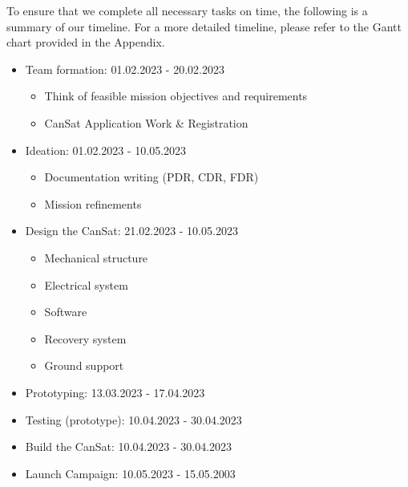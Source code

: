 \documentclass[11pt]{article}
\begin{document}
To ensure that we complete all necessary tasks on time, the following is a summary of our timeline. For a more detailed timeline, please refer to the Gantt chart provided in the Appendix.

\begin{itemize}[leftmargin=1cm, itemindent=0.25cm, noitemsep, topsep=0pt, label=$\bullet$]
\item Team formation: 01.02.2023 - 20.02.2023
\begin{multicols}{2}[\vspace{-0.75\baselineskip}]
\begin{itemize}[label=, noitemsep, topsep=2pt]
\item Think of feasible mission objectives and requirements
\item CanSat Application Work \& Registration
\end{itemize}
\end{multicols}
\vspace*{-0.75\baselineskip}
\item Ideation: 01.02.2023 - 10.05.2023
\begin{multicols}{2}[\vspace{-0.75\baselineskip}]
\begin{itemize}[label=, noitemsep, topsep=2pt]
\item Documentation writing (PDR, CDR, FDR)
\item Mission refinements
\end{itemize}
\end{multicols}
\vspace*{-0.75\baselineskip}
\item Design the CanSat: 21.02.2023 - 10.05.2023
\begin{multicols}{2}[\vspace{-0.75\baselineskip}]
\begin{itemize}[label=, noitemsep, topsep=2pt]
\item Mechanical structure 
\item Electrical system
\item Software
\item Recovery system
\item Ground support
\end{itemize}
\end{multicols}
\vspace*{-0.75\baselineskip}
\item Prototyping: 13.03.2023 - 17.04.2023
\item Testing (prototype): 10.04.2023 - 30.04.2023
\item Build the CanSat: 10.04.2023 - 30.04.2023
\item Launch Campaign: 10.05.2023 - 15.05.2003
\end{itemize}
\end{document}
